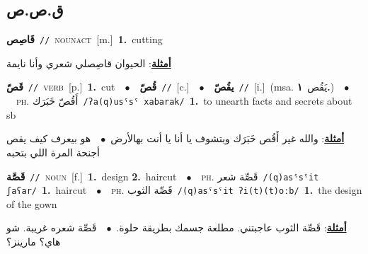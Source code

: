 \documentclass[10pt,a4paper,twoside]{article} %
\begin{document}
\begin{multicols}{2}
\vspace{-3mm}
\subsection*{\color{blue}\foreignlanguage{arabic}{ق.ص.ص}\color{blue}{}} 

{\setlength\topsep{0pt}\textbf{\foreignlanguage{arabic}{قَاصِص}}\ {\color{gray}\texttt{//}\color{black}}\ \textsc{noun\textunderscore act}\ [m.]\ \textbf{1.}~cutting\  \begin{flushright}\color{gray}\foreignlanguage{arabic}{\textbf{\underline{\foreignlanguage{arabic}{أمثلة}}}: الحيوان قاصِصلي شعري وأنا نايمة}\end{flushright}\color{black}} \vspace{2mm}

{\setlength\topsep{0pt}\textbf{\foreignlanguage{arabic}{قَصّ}}\ {\color{gray}\texttt{//}\color{black}}\ \textsc{verb}\ [p.]\ \textbf{1.}~cut\ \ $\bullet$\ \ \setlength\topsep{0pt}\textbf{\foreignlanguage{arabic}{قُصّ}}\ {\color{gray}\texttt{//}\color{black}}\ [c.]\ \ $\bullet$\ \ \setlength\topsep{0pt}\textbf{\foreignlanguage{arabic}{يقُصّ}}\ {\color{gray}\texttt{//}\color{black}}\ [i.]\ \color{gray}(msa. \foreignlanguage{arabic}{يَقُص}~\foreignlanguage{arabic}{\textbf{١.}})\color{black}\ \ $\bullet$\ \ \textsc{ph.} \color{gray} \foreignlanguage{arabic}{أَقُصّ خَبَرَك}\color{black}\ {\color{gray}\texttt{/{\sffamily ʔa(q)usˤsˤ xabarak}/}\color{black}}\ \textbf{1.}~to unearth facts and secrets about sb\  \begin{flushright}\color{gray}\foreignlanguage{arabic}{\textbf{\underline{\foreignlanguage{arabic}{أمثلة}}}: والله غير أَقُص خَبَرَك وبتشوف يا أنا يا أنت بهالأرض\ $\bullet$\ \  هو بيعرف كيف يقص أجنحة المرة اللي بتحبه}\end{flushright}\color{black}} \vspace{2mm}

{\setlength\topsep{0pt}\textbf{\foreignlanguage{arabic}{قَصَّة}}\ {\color{gray}\texttt{//}\color{black}}\ \textsc{noun}\ [f.]\ \textbf{1.}~design  \textbf{2.}~haircut\ \ $\bullet$\ \ \textsc{ph.} \color{gray} \foreignlanguage{arabic}{قَصِّة شعر}\color{black}\ {\color{gray}\texttt{/{\sffamily (q)asˤsˤit ʃaʕar}/}\color{black}}\ \textbf{1.}~haircut\ \ $\bullet$\ \ \textsc{ph.} \color{gray} \foreignlanguage{arabic}{قَصِّة الثوب}\color{black}\ {\color{gray}\texttt{/{\sffamily (q)asˤsˤit ʔi(t)(t)oːb}/}\color{black}}\ \textbf{1.}~the design of the gown\  \begin{flushright}\color{gray}\foreignlanguage{arabic}{\textbf{\underline{\foreignlanguage{arabic}{أمثلة}}}: قَصِّة الثوب عاجبتني. مطلعة جسمك بطريقة حلوة.\ $\bullet$\ \  قَصِّة شعره غريبة. شو هاي؟ مارينز؟}\end{flushright}\color{black}} \vspace{2mm}


\end{multicols}
\end{document}
